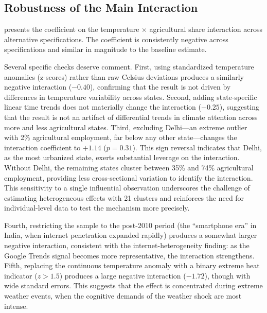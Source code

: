 \documentclass[12pt]{article}
\begin{document}


\subsection{Robustness of the Main Interaction}

 presents the coefficient on the temperature $\times$ agricultural share interaction across alternative specifications. The coefficient is consistently negative across specifications and similar in magnitude to the baseline estimate.



Several specific checks deserve comment. First, using standardized temperature anomalies (z-scores) rather than raw Celsius deviations produces a similarly negative interaction ($-0.40$), confirming that the result is not driven by differences in temperature variability across states. Second, adding state-specific linear time trends does not materially change the interaction ($-0.25$), suggesting that the result is not an artifact of differential trends in climate attention across more and less agricultural states. Third, excluding Delhi---an extreme outlier with 2\% agricultural employment, far below any other state---changes the interaction coefficient to $+1.14$ ($p = 0.31$). This sign reversal indicates that Delhi, as the most urbanized state, exerts substantial leverage on the interaction. Without Delhi, the remaining states cluster between 35\% and 74\% agricultural employment, providing less cross-sectional variation to identify the interaction. This sensitivity to a single influential observation underscores the challenge of estimating heterogeneous effects with 21 clusters and reinforces the need for individual-level data to test the mechanism more precisely.

Fourth, restricting the sample to the post-2010 period (the ``smartphone era'' in India, when internet penetration expanded rapidly) produces a somewhat larger negative interaction, consistent with the internet-heterogeneity finding: as the Google Trends signal becomes more representative, the interaction strengthens. Fifth, replacing the continuous temperature anomaly with a binary extreme heat indicator ($z > 1.5$) produces a large negative interaction ($-1.72$), though with wide standard errors. This suggests that the effect is concentrated during extreme weather events, when the cognitive demands of the weather shock are most intense.
\end{document}

